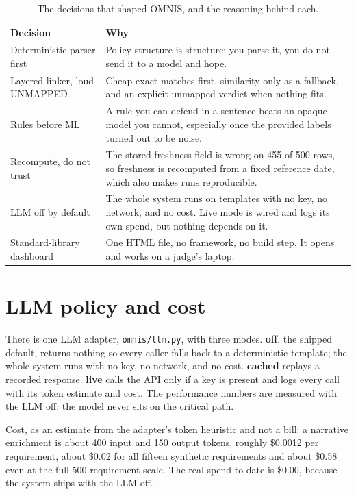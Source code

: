 \documentclass[11pt]{article}
\newcommand{\code}[1]{\texttt{\small #1}}
\begin{document}
\begin{table}[H]
\sffamily\small
\renewcommand{\arraystretch}{1.3}
\begin{tabularx}{\linewidth}{@{}lX@{}}
\toprule
Decision & Why \\
\midrule
Deterministic parser first & Policy structure is structure; you parse it, you do not send it to a model and hope. \\
Layered linker, loud UNMAPPED & Cheap exact matches first, similarity only as a fallback, and an explicit unmapped verdict when nothing fits. \\
Rules before ML & A rule you can defend in a sentence beats an opaque model you cannot, especially once the provided labels turned out to be noise. \\
Recompute, do not trust & The stored freshness field is wrong on 455 of 500 rows, so freshness is recomputed from a fixed reference date, which also makes runs reproducible. \\
LLM off by default & The whole system runs on templates with no key, no network, and no cost. Live mode is wired and logs its own spend, but nothing depends on it. \\
Standard-library dashboard & One HTML file, no framework, no build step. It opens and works on a judge's laptop. \\
\bottomrule
\end{tabularx}
\caption{The decisions that shaped OMNIS, and the reasoning behind each.}
\end{table}

\section{LLM policy and cost}

There is one LLM adapter, \code{omnis/llm.py}, with three modes. \textbf{off}, the shipped
default, returns nothing so every caller falls back to a deterministic template; the whole
system runs with no key, no network, and no cost. \textbf{cached} replays a recorded
response. \textbf{live} calls the API only if a key is present and logs every call with its
token estimate and cost. The performance numbers are measured with the LLM off; the model
never sits on the critical path.

Cost, as an estimate from the adapter's token heuristic and not a bill: a narrative
enrichment is about 400 input and 150 output tokens, roughly \$0.0012 per requirement,
about \$0.02 for all fifteen synthetic requirements and about \$0.58 even at the full
500-requirement scale. The real spend to date is \$0.00, because the system ships with the
LLM off.
\end{document}
